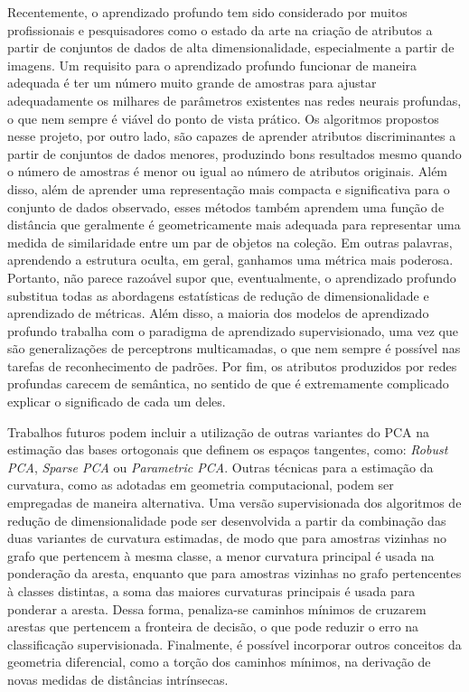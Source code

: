 \documentclass[a4paper,12pt]{article}
\begin{document}
Recentemente, o aprendizado profundo tem sido considerado por muitos profissionais e pesquisadores como o estado da arte na criação de atributos a partir de conjuntos de dados de alta dimensionalidade, especialmente a partir de imagens. Um requisito para o aprendizado profundo funcionar de maneira adequada é ter um número muito grande de amostras para ajustar adequadamente os milhares de parâmetros existentes nas redes neurais profundas, o que nem sempre é viável do ponto de vista prático. Os algoritmos propostos nesse projeto, por outro lado, são capazes de aprender atributos discriminantes a partir de conjuntos de dados menores, produzindo bons resultados mesmo quando o número de amostras é menor ou igual ao número de atributos originais. Além disso, além de aprender uma representação mais compacta e significativa para o conjunto de dados observado, esses métodos também aprendem uma função de distância que geralmente é geometricamente mais adequada para representar uma medida de similaridade entre um par de objetos na coleção. Em outras palavras, aprendendo a estrutura oculta, em geral, ganhamos uma métrica mais poderosa. Portanto, não parece razoável supor que, eventualmente, o aprendizado profundo substitua todas as abordagens estatísticas de redução de dimensionalidade e aprendizado de métricas. Além disso, a maioria dos modelos de aprendizado profundo trabalha com o paradigma de aprendizado supervisionado, uma vez que são generalizações de perceptrons multicamadas, o que nem sempre é possível nas tarefas de reconhecimento de padrões. Por fim, os atributos produzidos por redes profundas carecem de semântica, no sentido de que é extremamente complicado explicar o significado de cada um deles. 

Trabalhos futuros podem incluir a utilização de outras variantes do PCA na estimação das bases ortogonais que definem os espaços tangentes, como: \emph{Robust PCA}, \emph{Sparse PCA} ou \emph{Parametric PCA}. Outras técnicas para a estimação da curvatura, como as adotadas em geometria computacional, podem ser empregadas de maneira alternativa. Uma versão supervisionada dos algoritmos de redução de dimensionalidade pode ser desenvolvida a partir da combinação das duas variantes de curvatura estimadas, de modo que para amostras vizinhas no grafo que pertencem à mesma classe, a menor curvatura principal é usada na ponderação da aresta, enquanto que para amostras vizinhas no grafo pertencentes à classes distintas, a soma das maiores curvaturas principais é usada para ponderar a aresta. Dessa forma, penaliza-se caminhos mínimos de cruzarem arestas que pertencem a fronteira de decisão, o que pode reduzir o erro na classificação supervisionada. Finalmente, é possível incorporar outros conceitos da geometria diferencial, como a torção dos caminhos mínimos, na derivação de novas medidas de distâncias intrínsecas.
\end{document}
